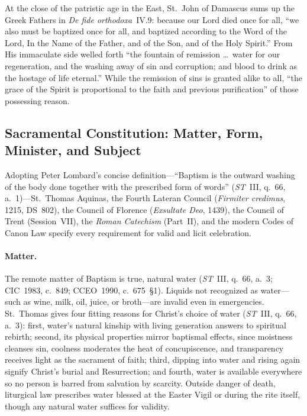 At the close of the patristic age in the East, St.~John of Damascus sums up the Greek Fathers in \emph{De fide orthodoxa}~IV.9: because our Lord died once for all, ``we also must be baptized once for all, and baptized according to the Word of the Lord, In the Name of the Father, and of the Son, and of the Holy Spirit.'' From His immaculate side welled forth ``the fountain of remission \dots\ water for our regeneration, and the washing away of sin and corruption; and blood to drink as the hostage of life eternal.'' While the remission of sins is granted alike to all, ``the grace of the Spirit is proportional to the faith and previous purification'' of those possessing reason.

\subsection{Sacramental Constitution: Matter, Form, Minister, and Subject}
\label{subsec:baptism-constitution}

Adopting Peter Lombard's concise definition---``Baptism is the outward washing of the body done together with the prescribed form of words'' (\emph{ST}~III, q.~66, a.~1)---St.~Thomas Aquinas, the Fourth Lateran Council (\emph{Firmiter credimus}, 1215, DS~802), the Council of Florence (\emph{Exsultate Deo}, 1439), the Council of Trent (Session~VII), the \emph{Roman Catechism} (Part~II), and the modern Codes of Canon Law specify every requirement for valid and licit celebration.

\paragraph{Matter.}
The remote matter of Baptism is true, natural water (\emph{ST}~III, q.~66, a.~3; CIC~1983, c.~849; CCEO~1990, c.~675~\S1). Liquids not recognized as water---such as wine, milk, oil, juice, or broth---are invalid even in emergencies. St.~Thomas gives four fitting reasons for Christ's choice of water (\emph{ST}~III, q.~66, a.~3): first, water's natural kinship with living generation answers to spiritual rebirth; second, its physical properties mirror baptismal effects, since moistness cleanses sin, coolness moderates the heat of concupiscence, and transparency receives light as the sacrament of faith; third, dipping into water and rising again signify Christ's burial and Resurrection; and fourth, water is available everywhere so no person is barred from salvation by scarcity. Outside danger of death, liturgical law prescribes water blessed at the Easter Vigil or during the rite itself, though any natural water suffices for validity.

